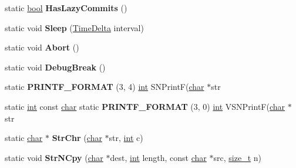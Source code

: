 \begin{DoxyCompactItemize}
\mbox{\label{classv8_1_1base_1_1OS_a1e1f6886901ee75380b7f0514952ea2f}} 
static \mbox{\hyperlink{classbool}{bool}} {\bfseries Has\+Lazy\+Commits} ()
\item 
\mbox{\label{classv8_1_1base_1_1OS_a04656670e0be067dfe2a93bd2c809b7c}} 
static void {\bfseries Sleep} (\mbox{\hyperlink{classv8_1_1base_1_1TimeDelta}{Time\+Delta}} interval)
\item 
\mbox{\label{classv8_1_1base_1_1OS_a3abddefa2e7ad8ab0628e6b44fad5a6b}} 
static void {\bfseries Abort} ()
\item 
\mbox{\label{classv8_1_1base_1_1OS_affd1b5cd2e2a82058f49432ffc5236e6}} 
static void {\bfseries Debug\+Break} ()
\item 
\mbox{\label{classv8_1_1base_1_1OS_ab13f2ea1271ff3fb5ce240414f5a86f6}} 
static {\bfseries P\+R\+I\+N\+T\+F\+\_\+\+F\+O\+R\+M\+AT} (3, 4) \mbox{\hyperlink{classint}{int}} S\+N\+PrintF(\mbox{\hyperlink{classchar}{char}} $\ast$str
\item 
\mbox{\label{classv8_1_1base_1_1OS_a7707c6d4774957b773ff8ee046912ffa}} 
static \mbox{\hyperlink{classint}{int}} const \mbox{\hyperlink{classchar}{char}} static {\bfseries P\+R\+I\+N\+T\+F\+\_\+\+F\+O\+R\+M\+AT} (3, 0) \mbox{\hyperlink{classint}{int}} V\+S\+N\+PrintF(\mbox{\hyperlink{classchar}{char}} $\ast$str
\item 
\mbox{\label{classv8_1_1base_1_1OS_abec10fefb549e2a4942a54f58a94c4bb}} 
static \mbox{\hyperlink{classchar}{char}} $\ast$ {\bfseries Str\+Chr} (\mbox{\hyperlink{classchar}{char}} $\ast$str, \mbox{\hyperlink{classint}{int}} c)
\item 
\mbox{\label{classv8_1_1base_1_1OS_aa2d5f71adc225182f5266fb2e4db2251}} 
static void {\bfseries Str\+N\+Cpy} (\mbox{\hyperlink{classchar}{char}} $\ast$dest, \mbox{\hyperlink{classint}{int}} length, const \mbox{\hyperlink{classchar}{char}} $\ast$src, \mbox{\hyperlink{classsize__t}{size\+\_\+t}} n)
\item 
\mbox{\label{classv8_1_1base_1_1OS_a9cf3746d7a51ec0026075a73469171bd}} 

\end{DoxyCompactItemize}

